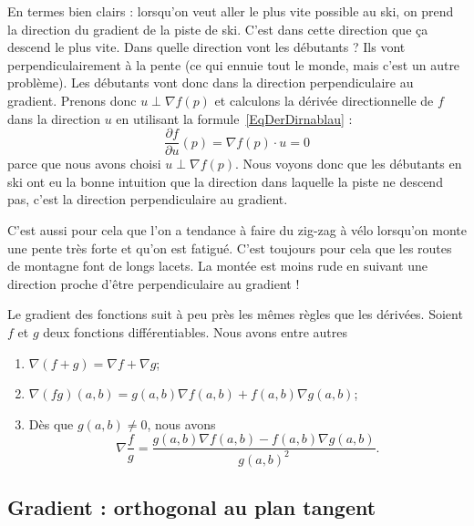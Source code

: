 En termes bien clairs : lorsqu'on veut aller le plus vite possible au ski, on prend la direction du gradient de la piste de ski. C'est dans cette direction que ça descend le plus vite. Dans quelle direction vont les débutants ? Ils vont perpendiculairement à la pente (ce qui ennuie tout le monde, mais c'est un autre problème). Les débutants vont donc dans la direction perpendiculaire au gradient. Prenons donc \( u\perp \nabla f(p)\) et calculons la dérivée directionnelle de \( f\) dans la direction \( u\) en utilisant la formule~\eqref{EqDerDirnablau} :
\begin{equation}
	\frac{ \partial f }{ \partial u }(p)=\nabla f(p)\cdot u=0
\end{equation}
parce que nous avons choisi \( u\perp \nabla f(p)\). Nous voyons donc que les débutants en ski ont eu la bonne intuition que la direction dans laquelle la piste ne descend pas, c'est la direction perpendiculaire au gradient.

C'est aussi pour cela que l'on a tendance à faire du zig-zag à vélo lorsqu'on monte une pente très forte et qu'on est fatigué. C'est toujours pour cela que les routes de montagne font de longs lacets. La montée est moins rude en suivant une direction proche d'être perpendiculaire au gradient !

\begin{theorem}
	Le gradient des fonctions suit à peu près les mêmes règles que les dérivées. Soient \( f\) et \( g\) deux fonctions différentiables. Nous avons entre autres
	\begin{enumerate}
		\item
		      \( \nabla(f+g)=\nabla f+\nabla g\);
		\item
		      \( \nabla(fg)(a,b)=g(a,b)\nabla f(a,b)+f(a,b)\nabla g(a,b)\);
		\item
		      Dès que \( g(a,b)\neq 0\), nous avons
		      \begin{equation}
			      \nabla\frac{ f }{ g }=\frac{ g(a,b)\nabla f(a,b)-f(a,b)\nabla g(a,b) }{ g(a,b)^2 }.
		      \end{equation}
	\end{enumerate}
\end{theorem}

\subsection{Gradient : orthogonal au plan tangent}

